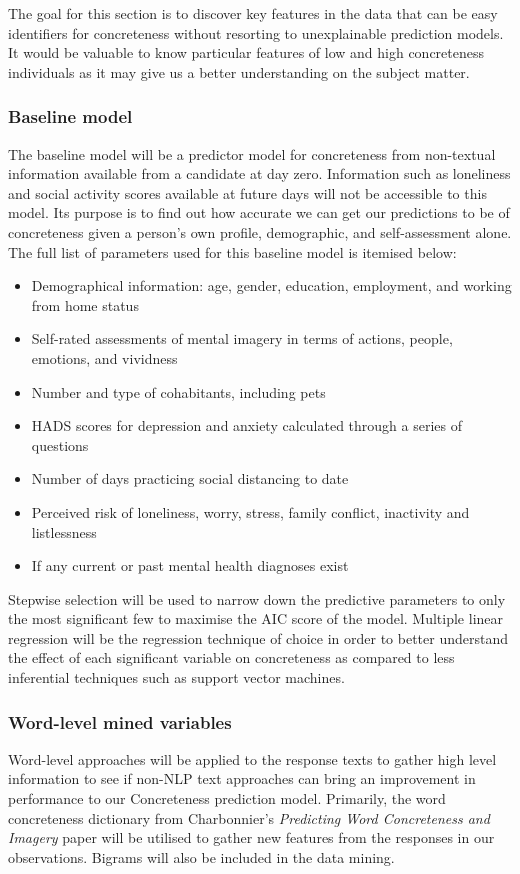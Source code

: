 \documentclass[12pt, a4paper]{article}
\begin{document}
The goal for this section is to discover key features in the data that can be easy identifiers for concreteness without resorting to unexplainable prediction models. It would be valuable to know particular features of low and high concreteness individuals as it may give us a better understanding on the subject matter.

\subsubsection{Baseline model}
The baseline model will be a predictor model for concreteness from non-textual information available from a candidate at day zero. Information such as loneliness and social activity scores available at future days will not be accessible to this model. Its purpose is to find out how accurate we can get our predictions to be of concreteness given a person's own profile, demographic, and self-assessment alone. The full list of parameters used for this baseline model is itemised below: 

\begin{itemize}
  \item Demographical information: age, gender, education, employment, and working from home status
  \item Self-rated assessments of mental imagery in terms of actions, people, emotions, and vividness
  \item Number and type of cohabitants, including pets
  \item HADS scores for depression and anxiety calculated through a series of questions
  \item Number of days practicing social distancing to date
  \item Perceived risk of loneliness, worry, stress, family conflict, inactivity and listlessness
  \item If any current or past mental health diagnoses exist

\end{itemize}

Stepwise selection will be used to narrow down the predictive parameters to only the most significant few to maximise the AIC score of the model. Multiple linear regression will be the regression technique of choice in order to better understand the effect of each significant variable on concreteness as compared to less inferential techniques such as support vector machines. 

\subsubsection{Word-level mined variables}
Word-level approaches will be applied to the response texts to gather high level information to see if non-NLP text approaches can bring an improvement in performance to our Concreteness prediction model. Primarily, the word concreteness dictionary from Charbonnier's \textit{Predicting Word Concreteness and Imagery} paper \cite{charbonnier-wartena-2019-predicting} will be utilised to gather new features from the responses in our observations. Bigrams will also be included in the data mining.
\end{document}
